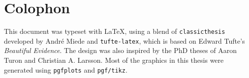 \pagestyle{empty}

\hfill

\vfill

\section*{Colophon}

\noindent
This document was typeset with \LaTeX, using a blend of
\texttt{classicthesis} developed by Andr{\'e} Miede and \texttt{tufte-latex},
which is based on Edward Tufte's \emph{Beautiful Evidence}. The design was also
inspired by the PhD theses of Aaron Turon and Christian A. Larsson. Most of the
graphics in this thesis were generated using \texttt{pgfplots} and
\texttt{pgf/tikz}.
